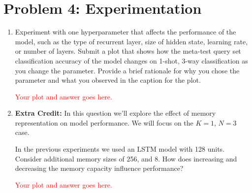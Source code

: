 \documentclass[12pt]{article}
\begin{document}
\section*{Problem 4: Experimentation}
\begin{enumerate}[label=\alph*]
    \item Experiment with one hyperparameter that affects the performance of the model, such as the type of recurrent layer, size of hidden state, learning rate, or number of layers.  Submit a plot that shows how the meta-test query set classification accuracy of the model changes on 1-shot, 3-way classification as you change the parameter. Provide a brief rationale for why you chose the parameter and what you observed in the caption for the plot.
    
    \textcolor{red}{Your plot and answer goes here.}
    
    
    \item \textbf{Extra Credit:} In this question we'll explore the effect of memory representation on model performance. We will focus on the $K=1$, $N=3$ case.
    
    In the previous experiments we used an LSTM model with 128 units. Consider additional memory sizes of 256, and 8. How does increasing and decreasing the memory capacity influence performance?
    
    \textcolor{red}{Your plot and answer goes here.}
    
\end{enumerate}


\newpage


\end{document}
